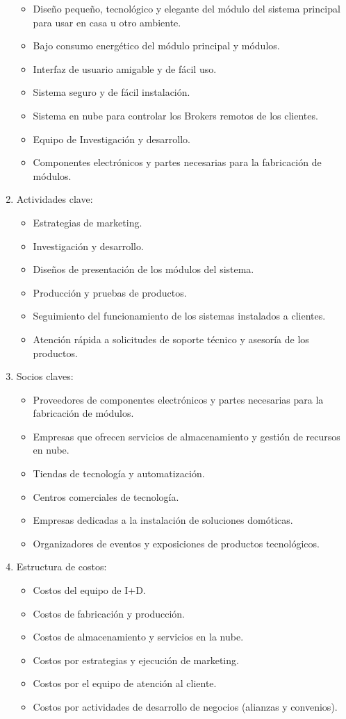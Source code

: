 \documentclass[11pt]{charter}
\begin{document}
\begin{enumerate}
\begin{itemize}
\item Diseño pequeño, tecnológico y elegante del módulo del sistema principal para usar en casa u otro ambiente.
\item Bajo consumo energético del módulo principal y módulos.
\item Interfaz de usuario amigable y de fácil uso.
\item Sistema seguro y de fácil instalación.
\item Sistema en nube para controlar los Brokers remotos de los clientes.
\item Equipo de Investigación y desarrollo.
\item Componentes electrónicos y partes necesarias para la fabricación de módulos.
\end{itemize}
\item Actividades clave:
\begin{itemize}
\item Estrategias de marketing.
\item Investigación y desarrollo.
\item Diseños de presentación de los módulos del sistema.
\item Producción y pruebas de productos.
\item Seguimiento del funcionamiento de los sistemas instalados a clientes.
\item Atención rápida a solicitudes de soporte técnico y asesoría de los productos. 
\end{itemize}
\item Socios claves:
\begin{itemize}
\item Proveedores de componentes electrónicos y partes necesarias para la fabricación de módulos.
\item Empresas que ofrecen servicios de almacenamiento y gestión de recursos en nube.
\item Tiendas de tecnología y automatización.
\item Centros comerciales de tecnología.
\item Empresas dedicadas a la instalación de soluciones domóticas.
\item Organizadores de eventos y exposiciones de productos tecnológicos.
\end{itemize}
\item Estructura de costos:
\begin{itemize}
\item Costos del equipo de I+D.
\item Costos de fabricación y producción.
\item Costos de almacenamiento y servicios en la nube.
\item Costos por estrategias y ejecución de marketing.
\item Costos por el equipo de atención al cliente.
\item Costos por actividades de desarrollo de negocios (alianzas y convenios).
\end{itemize}
\end{enumerate}
\end{document}
